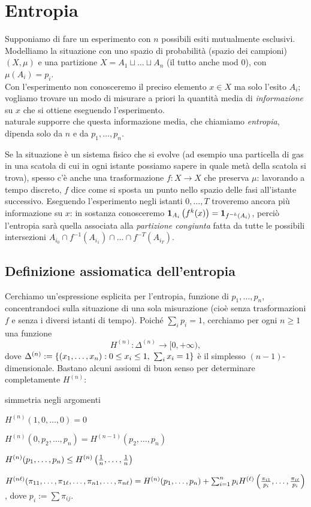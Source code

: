 \section{Entropia}

Supponiamo di fare un esperimento con $n$ possibili esiti mutualmente esclusivi.
Modelliamo la situazione con uno spazio di probabilità (spazio dei campioni) $(X,\mu)$
e una partizione $X=A_1\sqcup \dots\sqcup A_n$ (il tutto anche mod $0$), con $\mu(A_i)=p_i$. \\
Con l'esperimento non conosceremo il preciso elemento $x\in X$ ma solo l'esito $A_i$; vogliamo
trovare un modo di misurare a priori la quantità media di \emph{informazione} su $x$ che si ottiene eseguendo l'esperimento. \\
\Eacc naturale supporre che questa informazione media, che chiamiamo \emph{entropia}, dipenda solo da $n$ e da $p_1,\dots,p_n$.

Se la situazione è un sistema fisico che si evolve (ad esempio una particella di gas in una scatola di cui
in ogni istante possiamo sapere in quale metà della scatola si trova), spesso c'è anche una trasformazione $f:X\to X$
che preserva $\mu$: lavorando a tempo discreto, $f$ dice come si sposta un punto nello spazio delle fasi
all'istante successivo. Eseguendo l'esperimento negli istanti $0,\dots,T$ troveremo ancora più informazione su $x$:
in sostanza conosceremo $\bm{1}_{A_i}\left(f^k(x)\right)=\bm{1}_{f^{-k}(A_i)}$, perciò l'entropia sarà quella associata
alla \emph{partizione congiunta} fatta da tutte le possibili intersezioni $A_{i_0}\cap f^{-1}(A_{i_1})\cap \dots\cap f^{-T}(A_{i_T})$.

\subsection{Definizione assiomatica dell'entropia}
Cerchiamo un'espressione esplicita per l'entropia, funzione di $p_1,\dots,p_n$, concentrandoci sulla situazione di una sola misurazione
(cioè senza trasformazioni $f$ e senza i diversi istanti di tempo).
Poiché $\sum_i p_i=1$, cerchiamo per ogni $n\ge 1$ una funzione
\[ H^{(n)}:\Delta^{(n)}\to [0,+\infty), \]
dove $\Delta^{(n)}:=\left\{(x_1,\dots,x_n):0\le x_i\le 1,\ \sum_i x_i=1\right\}$ è il simplesso $(n-1)$-dimensionale. Bastano alcuni assiomi di buon senso per determinare completamente $H^{(n)}$:
\begin{lista}
\item simmetria negli argomenti
\item $H^{(n)}(1,0,\dots,0)=0$
\item $H^{(n)}(0,p_2,\dots,p_n)=H^{(n-1)}(p_2,\dots,p_n)$
\item $H^{(n)}(p_1,\dots,p_n)\le H^{(n)}\left(\frac{1}{n},\dots,\frac{1}{n}\right)$
\item $H^{(n\ell)}(\pi_{11},\dots,\pi_{1\ell},\dots,\pi_{n1},\dots,\pi_{n\ell})=H^{(n)}(p_1,\dots,p_n)
+\sum_{i=1}^n p_i H^{(\ell)}\left(\frac{\pi_{i1}}{p_i},\dots,\frac{\pi_{i\ell}}{p_i}\right)$, dove $p_i:=\sum \pi_{ij}$.
\end{lista}

